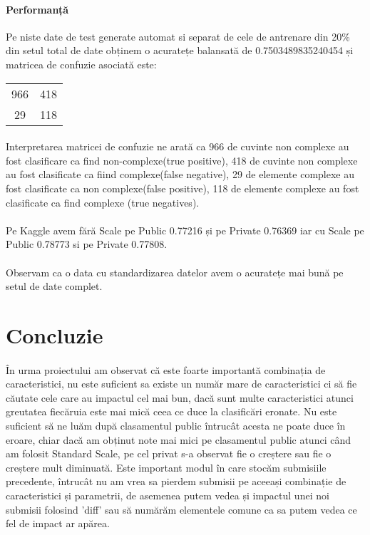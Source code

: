 \documentclass{article}
\begin{document}
 
\paragraph{Performanță} Pe niste date de test generate automat si separat de cele de antrenare din 20\% din setul total de date obținem o acuratețe balansată de 0.7503489835240454 și matricea de confuzie asociată este:
\begin{center}
  \begin{tabular}{ |c|c| }
   \hline
   966  & 418 \\
   29  & 118 \\
   \hline
  \end{tabular}
\end{center}
\paragraph{}Interpretarea matricei de confuzie ne arată ca 966 de cuvinte non complexe au fost clasificare ca find non-complexe(true positive), 418 de cuvinte non complexe au fost clasificate ca fiind complexe(false negative),
29 de elemente complexe au fost clasificate ca non complexe(false positive), 118 de elemente complexe au fost clasificate ca find complexe (true negatives).
 
\paragraph{} Pe Kaggle avem fără Scale pe Public 0.77216 și pe Private 0.76369 iar cu Scale pe Public 0.78773 si pe Private 0.77808.
\paragraph{} Observam ca o data cu standardizarea datelor avem o acuratețe mai bună pe setul de date complet.
 
\section{Concluzie}
\paragraph{} În urma proiectului am observat că este foarte importantă combinația de caracteristici, nu este suficient sa existe un număr mare de caracteristici ci să fie căutate cele care au impactul cel mai bun, dacă sunt multe caracteristici atunci greutatea fiecăruia este mai mică ceea ce duce la clasificări eronate. Nu este suficient să ne luăm după clasamentul public întrucât acesta ne poate duce în eroare, chiar dacă am obținut note mai mici pe clasamentul public atunci când am folosit Standard Scale, pe cel privat s-a observat fie o creștere sau fie o creștere mult diminuată. Este important modul în care stocăm submisiile precedente, întrucât nu am vrea sa pierdem submisii pe aceeași combinație de caracteristici și parametrii, de asemenea putem vedea și impactul unei noi submisii folosind 'diff' sau să numărăm elementele comune ca sa putem vedea ce fel de impact ar apărea.
 
\end{document}
